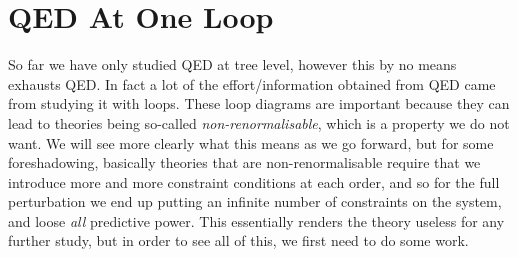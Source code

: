 \chapter{QED At One Loop}

So far we have only studied QED at tree level, however this by no means exhausts QED. In fact a lot of the effort/information obtained from QED came from studying it with loops. These loop diagrams are important because they can lead to theories being so-called \textit{non-renormalisable}, which is a property we do not want. We will see more clearly what this means as we go forward, but for some foreshadowing, basically theories that are non-renormalisable require that we introduce more and more constraint conditions at each order, and so for the full perturbation we end up putting an infinite number of constraints on the system, and loose \textit{all} predictive power. This essentially renders the theory useless for any further study, but in order to see all of this, we first need to do some work. 

